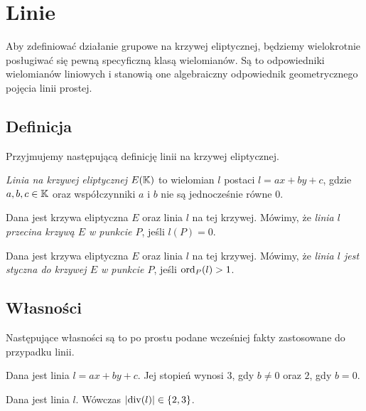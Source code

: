 \section{Linie}

Aby zdefiniować działanie grupowe na krzywej eliptycznej,
będziemy wielokrotnie posługiwać się
pewną specyficzną klasą wielomianów.
Są to odpowiedniki wielomianów liniowych
i stanowią one algebraiczny odpowiednik
geometrycznego pojęcia linii prostej.

\subsection*{Definicja}

Przyjmujemy następującą definicję linii na krzywej eliptycznej.

\begin{definition}
\emph{Linia na krzywej eliptycznej $E(\mathbb{K})$}
to wielomian $l$ postaci $l = ax + by +c$,
gdzie $a, b, c \in \mathbb{K}$
oraz współczynniki $a$ i $b$ nie są jednocześnie równe $0$.
\end{definition}

\begin{definition}
Dana jest krzywa eliptyczna $E$ oraz linia $l$ na tej krzywej.
Mówimy, że \emph{linia $l$ przecina krzywą $E$ w punkcie $P$},
jeśli $l(P) = 0$.
\end{definition}

\begin{definition}
Dana jest krzywa eliptyczna $E$ oraz linia $l$ na tej krzywej.
Mówimy, że \emph{linia $l$ jest styczna do krzywej $E$ w punkcie $P$},
jeśli $\operatorname{ord}_P(l) > 1$.
\end{definition}

\subsection*{Własności}

Następujące własności są to po prostu podane wcześniej fakty
zastosowane do przypadku linii.

\begin{fact}\label{line_deg_fact}
Dana jest linia $l = ax + by + c$.
Jej stopień wynosi $3$, gdy $b \neq 0$
oraz $2$, gdy $b = 0$.
\end{fact}

\begin{fact}\label{line_divisor_norm_fact}
Dana jest linia $l$.
Wówczas $\lvert\operatorname{div}(l)\rvert \in \{2,3\}$.
\end{fact}

